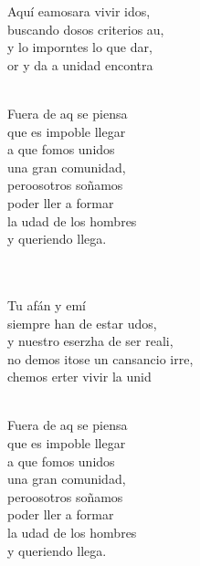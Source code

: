 \documentclass[12pt]{article}
\begin{document}
\begin{multicols*}{2}
\begin{cancion}%
	Aquí eamosara vivir idos,\\
	buscando dosos criterios au,\\
	y lo imporntes lo que dar,\\
	or y da a unidad encontra  \\\jump\\
	\begin{chorus}%
	Fuera de aq se piensa  \\
	que es impoble llegar\\
	a que fomos unidos \\
una gran comunidad,\\
	peroosotros soñamos \\
	poder ller a formar\\
	la udad de los hombres \\
	y queriendo llega.\\
	\end{chorus}%
	\jump\\
\jump
	      \\
	Tu afán y emí \\
	siempre han de estar udos, \\
	y nuestro eserzha de ser reali,\\
	no demos itose un cansancio irre,\\
	chemos erter vivir la unid\\\jump\\
	\begin{chorus}%
	Fuera de aq se piensa  \\
	que es impoble llegar\\
	a que fomos unidos \\
una gran comunidad,\\
	peroosotros soñamos \\
	poder ller a formar\\
	la udad de los hombres \\
	y queriendo llega.\\
	\end{chorus}%
	\jump\\
\end{cancion}%


\end{multicols*}
\end{document}
